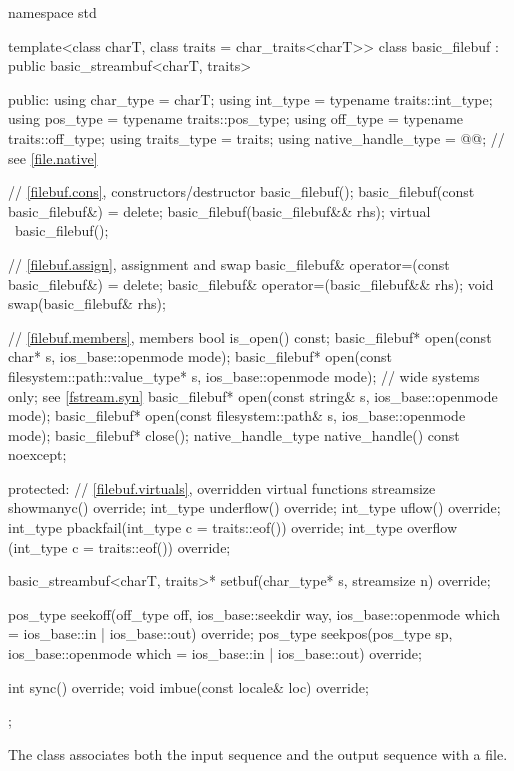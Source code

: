 %
\begin{codeblock}
namespace std {
  template<class charT, class traits = char_traits<charT>>
  class basic_filebuf : public basic_streambuf<charT, traits> {
  public:
    using char_type   = charT;
    using int_type    = typename traits::int_type;
    using pos_type    = typename traits::pos_type;
    using off_type    = typename traits::off_type;
    using traits_type = traits;
    using native_handle_type = @@;   // see \ref{file.native}

    // \ref{filebuf.cons}, constructors/destructor
    basic_filebuf();
    basic_filebuf(const basic_filebuf&) = delete;
    basic_filebuf(basic_filebuf&& rhs);
    virtual ~basic_filebuf();

    // \ref{filebuf.assign}, assignment and swap
    basic_filebuf& operator=(const basic_filebuf&) = delete;
    basic_filebuf& operator=(basic_filebuf&& rhs);
    void swap(basic_filebuf& rhs);

    // \ref{filebuf.members}, members
    bool is_open() const;
    basic_filebuf* open(const char* s, ios_base::openmode mode);
    basic_filebuf* open(const filesystem::path::value_type* s,
                        ios_base::openmode mode);   // wide systems only; see \ref{fstream.syn}
    basic_filebuf* open(const string& s, ios_base::openmode mode);
    basic_filebuf* open(const filesystem::path& s, ios_base::openmode mode);
    basic_filebuf* close();
    native_handle_type native_handle() const noexcept;

  protected:
    // \ref{filebuf.virtuals}, overridden virtual functions
    streamsize showmanyc() override;
    int_type underflow() override;
    int_type uflow() override;
    int_type pbackfail(int_type c = traits::eof()) override;
    int_type overflow (int_type c = traits::eof()) override;

    basic_streambuf<charT, traits>* setbuf(char_type* s, streamsize n) override;

    pos_type seekoff(off_type off, ios_base::seekdir way,
                     ios_base::openmode which = ios_base::in | ios_base::out) override;
    pos_type seekpos(pos_type sp,
                     ios_base::openmode which = ios_base::in | ios_base::out) override;

    int sync() override;
    void imbue(const locale& loc) override;
  };
}
\end{codeblock}

\pnum
The class
associates both the input sequence and the output
sequence with a file.


